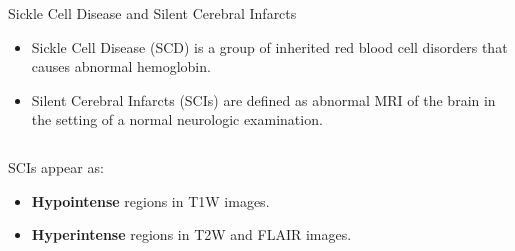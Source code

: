 \documentclass[]{standalone}
\begin{document}
	\begin{frame}{Sickle Cell Disease and Silent Cerebral Infarcts}{}
	\begin{itemize}
		\item Sickle Cell Disease (SCD) is a group of inherited red blood cell disorders that causes abnormal hemoglobin.
		
		\item Silent Cerebral Infarcts (SCIs) are defined as abnormal MRI of the brain in the setting of a normal neurologic examination.
	\end{itemize}
	\begin{columns}
		\begin{column}{0.45\textwidth}
		SCIs appear as:
			\begin{itemize}
			\item \textbf{Hypointense} regions in T1W images.
			\item \textbf{Hyperintense} regions in T2W and FLAIR images.
			\end{itemize}
			
		\end{column}
		

\end{columns}
\end{frame}
\end{document}
